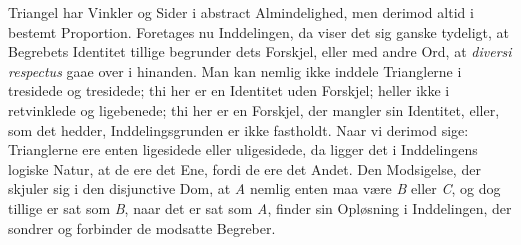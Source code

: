 \documentclass[12pt]{book}
\begin{document}
Triangel har Vinkler og Sider i abstract Almindelighed, men derimod altid i bestemt
Proportion. Foretages nu Inddelingen, da viser det sig ganske tydeligt, at Begrebets
Identitet tillige begrunder dets Forskjel, eller med andre Ord, at \textit{diversi
respectus} gaae over i hinanden. Man kan nemlig ikke inddele Trianglerne i tresidede
og tresidede; thi her er en Identitet uden Forskjel; heller ikke i retvinklede og
ligebenede; thi her er en Forskjel, der mangler sin Identitet, eller, som det hedder,
Inddelingsgrunden er ikke fastholdt. Naar vi derimod sige: Trianglerne ere enten
ligesidede eller uligesidede, da ligger det i Inddelingens logiske Natur, at de ere
det Ene, fordi de ere det Andet. Den Modsigelse, der skjuler sig i den disjunctive
Dom, at \textit{A} nemlig enten maa være \textit{B} eller \textit{C}, og dog tillige
er sat som \textit{B}, naar det er sat som \textit{A}, finder sin Opløsning i
Inddelingen, der sondrer og forbinder de modsatte Begreber.
\end{document}
